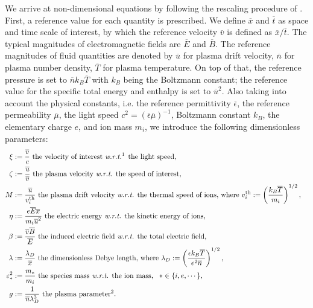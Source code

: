 \documentclass{article}
\begin{document}
We arrive at non-dimensional equations by following the rescaling procedure of
\cite[][Sec. 2.2]{degond_2017}.  First, a reference value for each quantity is
prescribed. We define $\overline{x}$ and $\overline{t}$ as space and time scale of
interest, by which the reference velocity $\overline{v}$ is defined as
$\overline{x}/\overline{t}$. The typical magnitudes of electromagnetic fields are
$\overline{E}$ and $\overline{B}$. The reference magnitudes of fluid quantities are
denoted by $\overline{u}$ for plasma drift velocity, $\overline{n}$ for plasma number
density, $\overline{T}$ for plasma temperature. On top of that, the reference pressure is
set to $\overline{n}k_B\overline{T}$ with $k_B$ being the Boltzmann constant; the
reference value for the specific total energy and enthalpy is set to
$\overline{u}^2$. Also taking into account the physical constants, i.e. the reference
permittivity $\overline{\epsilon}$, the reference permeability $\overline{\mu}$, the light
speed $c^2 = (\overline{\epsilon}\overline{\mu})^{-1}$, Boltzmann constant $k_B$, the
elementary charge $e$, and ion mass $m_i$, we introduce the following dimensionless
parameters:
\begin{align*} 
  \xi &:= \frac{\overline{v}}{c} \text{ the velocity of interest \emph{w.r.t.}\footnotemark[1] the light speed}, &\\
  \zeta &:= \frac{\overline{u}}{\overline{v}} \text{ the plasma velocity \emph{w.r.t.} the speed of interest}, &\\
  M &:= \frac{\overline{u}}{v_i^{\text{th}}} \text{ the plasma drift velocity \emph{w.r.t.} the thermal speed of ions, where } v_i^{\text{th}} := \left(\frac{k_B \overline{T}}{m_i}\right)^{1/2}, &\\
  \eta &:= \frac{e\overline{E}\overline{x}}{m_i\overline{u}^2} \text{ the electric energy \emph{w.r.t.} the kinetic energy of ions}, &\\
  \beta &:= \frac{\overline{v}\overline{B}}{\overline{E}} \text{ the induced electric field \emph{w.r.t.} the total electric field}, &\\
  \lambda &:= \frac{\lambda_D}{\overline{x}} \text{ the dimensionless Debye length, where }\lambda_D := \left(\frac{\epsilon k_B\overline{T}}{e^2\overline{n}}\right)^{1/2}, &\\
  \varepsilon_*^2 &:= \frac{m_*}{m_i} \text{ the species mass \emph{w.r.t.} the ion mass},\ \  * \in \{i,e,\cdots\}, &\\
  g &:= \frac{1}{\overline{n}\lambda_D^3} \text{ the plasma parameter\footnotemark[2]}.&
\end{align*}
\end{document}
